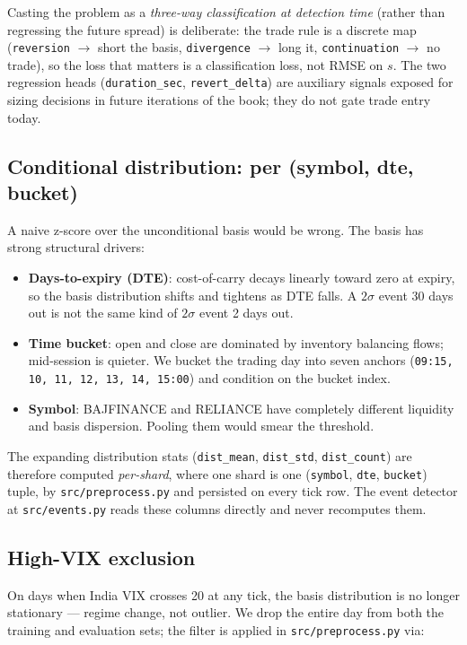 \documentclass[11pt,a4paper]{article}
\begin{document}
Casting the problem as a \emph{three-way classification at detection time} (rather than regressing the future spread) is deliberate: the trade rule is a discrete map (\texttt{reversion} $\to$ short the basis, \texttt{divergence} $\to$ long it, \texttt{continuation} $\to$ no trade), so the loss that matters is a classification loss, not RMSE on $s$. The two regression heads (\texttt{duration\_sec}, \texttt{revert\_delta}) are auxiliary signals exposed for sizing decisions in future iterations of the book; they do not gate trade entry today.

\subsection{Conditional distribution: per (symbol, dte, bucket)}
A naive z-score over the unconditional basis would be wrong. The basis has strong structural drivers:
\begin{itemize}[leftmargin=1.5em,itemsep=0pt]
  \item \textbf{Days-to-expiry (DTE)}: cost-of-carry decays linearly toward zero at expiry, so the basis distribution shifts and tightens as DTE falls. A $2\sigma$ event 30 days out is not the same kind of $2\sigma$ event 2 days out.
  \item \textbf{Time bucket}: open and close are dominated by inventory balancing flows; mid-session is quieter. We bucket the trading day into seven anchors (\texttt{09:15, 10, 11, 12, 13, 14, 15:00}) and condition on the bucket index.
  \item \textbf{Symbol}: BAJFINANCE and RELIANCE have completely different liquidity and basis dispersion. Pooling them would smear the threshold.
\end{itemize}
The expanding distribution stats (\texttt{dist\_mean}, \texttt{dist\_std}, \texttt{dist\_count}) are therefore computed \emph{per-shard}, where one shard is one (\texttt{symbol}, \texttt{dte}, \texttt{bucket}) tuple, by \texttt{src/preprocess.py} and persisted on every tick row. The event detector at \texttt{src/events.py} reads these columns directly and never recomputes them.

\subsection{High-VIX exclusion}
On days when India VIX crosses 20 at any tick, the basis distribution is no longer stationary --- regime change, not outlier. We drop the entire day from both the training and evaluation sets; the filter is applied in \texttt{src/preprocess.py} via:
\end{document}
